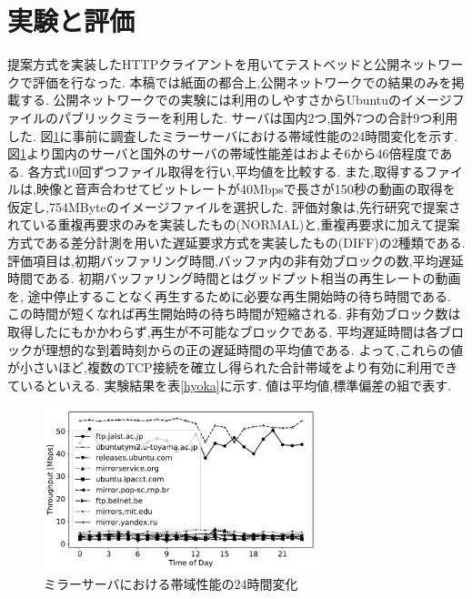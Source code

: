 \documentclass{ltjsarticle}
\begin{document}
\section{実験と評価}
\vspace{-3mm}
提案方式を実装したHTTPクライアントを用いてテストベッドと公開ネットワークで評価を行なった.
本稿では紙面の都合上,公開ネットワークでの結果のみを掲載する.
公開ネットワークでの実験には利用のしやすさからUbuntuのイメージファイルのパブリックミラーを利用した.
サーバは国内2つ,国外7つの合計9つ利用した.
図\ref{mirror}に事前に調査したミラーサーバにおける帯域性能の24時間変化を示す.
図\ref{mirror}より国内のサーバと国外のサーバの帯域性能差はおよそ6から46倍程度である.
各方式10回ずつファイル取得を行い,平均値を比較する.
また,取得するファイルは,映像と音声合わせてビットレートが40Mbpsで長さが150秒の動画の取得を仮定し,754MByteのイメージファイルを選択した.
評価対象は,先行研究で提案されている重複再要求のみを実装したもの(NORMAL)と,重複再要求に加えて提案方式である差分計測を用いた遅延要求方式を実装したもの(DIFF)の2種類である.
評価項目は,初期バッファリング時間,バッファ内の非有効ブロックの数,平均遅延時間である.
初期バッファリング時間とはグッドプット相当の再生レートの動画を,
途中停止することなく再生するために必要な再生開始時の待ち時間である.
この時間が短くなれば再生開始時の待ち時間が短縮される.
非有効ブロック数は取得したにもかかわらず,再生が不可能なブロックである.
平均遅延時間は各ブロックが理想的な到着時刻からの正の遅延時間の平均値である.
よって,これらの値が小さいほど,複数のTCP接続を確立し得られた合計帯域をより有効に利用できているといえる.
実験結果を表\ref{hyoka}に示す.
値は平均値,標準偏差の組で表す.
\vspace{-8mm}
\begin{table}[htb]
	\begin{center}
		\caption{実験結果}
		\label{hyoka}
		\vspace{-3.5mm}
	\end{center}
\end{table}
\vspace{-11mm}
\begin{figure}[h]
	\centering
	\includegraphics[width=8cm]{figure/thp24h-g.pdf}
	\vspace{-5.5mm}
	\caption{ミラーサーバにおける帯域性能の24時間変化}
	\label{mirror}
\end{figure}
\end{document}
